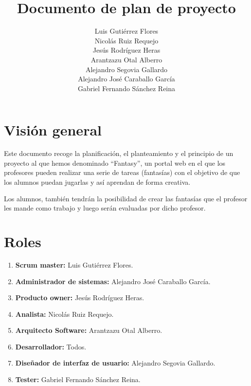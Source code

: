 \documentclass[12pt,letterpaper]{article}
\title{Documento de plan de proyecto}
\author{Luis Gutiérrez Flores\\
	Nicolás Ruiz Requejo\\
	Jesús Rodríguez Heras\\
	Arantzazu Otal Alberro\\
	Alejandro Segovia Gallardo\\
	Alejandro José Caraballo García\\
	Gabriel Fernando Sánchez Reina}
\begin{document}
	
	\maketitle

	\thispagestyle{empty}
	\newpage
	
	\tableofcontents
	\newpage
	
	
	
	
	\lstset{language=bash, numbers=left, numberstyle=\tiny, numbersep=10pt, firstnumber=1, stepnumber=1, basicstyle=\small\ttfamily, tabsize=1, extendedchars=true, inputencoding=latin1}

\section{Visión general}
Este documento recoge la planificación, el planteamiento y el principio de un proyecto al que hemos denominado ``Fantasy'', un portal web en el que los profesores pueden realizar una serie de tareas (fantasías) con el objetivo de que los alumnos puedan jugarlas y así aprendan de forma creativa.

Los alumnos, también tendrán la posibilidad de crear las fantasías que el profesor les mande como trabajo y luego serán evaluadas por dicho profesor.

\section{Roles}
\begin{enumerate}
	\item \textbf{Scrum master:} Luis Gutiérrez Flores.
	\item \textbf{Administrador de sistemas:} Alejandro José Caraballo García.
	\item \textbf{Producto owner:} Jesús Rodríguez Heras.
	\item \textbf{Analista:} Nicolás Ruiz Requejo.
	\item \textbf{Arquitecto Software:} Arantzazu Otal Alberro.
	\item \textbf{Desarrollador:} Todos.
	\item \textbf{Diseñador de interfaz de usuario:} Alejandro Segovia Gallardo.
	\item \textbf{Tester:} Gabriel Fernando Sánchez Reina.
\end{enumerate}
\end{document}
